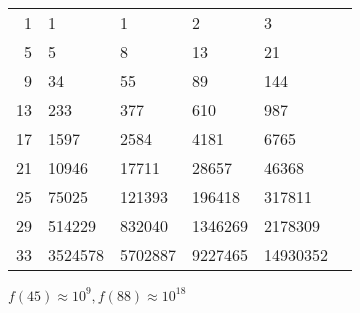 \documentclass[a4paper,10pt,twocolumn,oneside]{article}
\begin{document}
{\normalsize
\begin{center}
    \begin{tabular}{r|lllll}
        1 & 1 & 1 & 2 & 3 \\
        5 & 5 & 8 & 13 & 21 \\
        9 & 34 & 55 & 89 & 144 \\
        13 & 233 & 377 & 610 & 987 \\
        17 & 1597 & 2584 & 4181 & 6765 \\
        21 & 10946 & 17711 & 28657 & 46368 \\
        25 & 75025 & 121393 & 196418 & 317811 \\
        29 & 514229 & 832040 & 1346269 & 2178309 \\
        33 & 3524578 & 5702887 & 9227465 & 14930352
    \end{tabular}
\end{center}
\noindent
$f(45) \approx 10^9, f(88) \approx 10^{18}$
}
\end{document}
